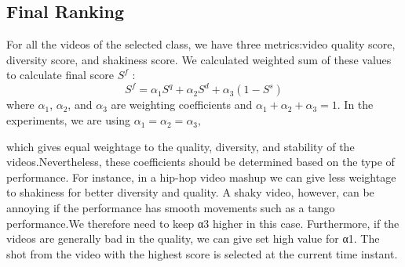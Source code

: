 \documentclass{sig-alternate}
\begin{document}
\subsection{Final Ranking}
For all the videos of the selected class, we have three metrics:video quality score, diversity score, and shakiness score. We calculated weighted sum of these values to calculate final score $S^f$ :
\[
 S^f = \alpha_1S^q+\alpha_2S^d+\alpha_3(1-S^s)
\]
where $\alpha_1$, $\alpha_2$, and $\alpha_3$ are weighting coefficients and $\alpha_1 + \alpha_2 + \alpha_3 = 1.$ In the experiments, we are using $\alpha_1 = \alpha_2 = \alpha_3,$\\

which gives equal weightage to the quality, diversity, and stability of the videos.Nevertheless, these coefficients should be determined based on the type of performance. For instance, in a hip-hop video mashup we can give less weightage to shakiness for better diversity and quality. A shaky video, however, can be annoying if the performance has smooth movements such as a tango performance.We therefore need to keep α3 higher in this case. Furthermore, if the videos are generally bad in the quality, we can give set high value for α1. The shot from the video with the highest score is selected at the current time instant.
\end{document}
